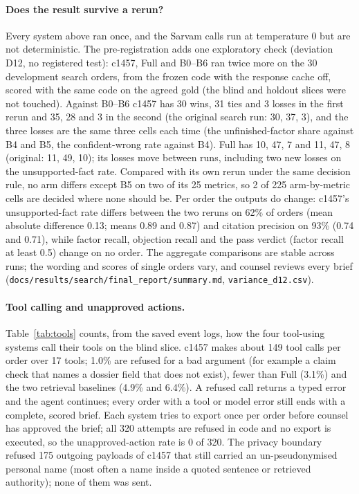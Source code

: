\paragraph{Does the result survive a rerun?} Every system above ran once, and the Sarvam calls run at temperature 0 but are not deterministic. The pre-registration adds one exploratory check (deviation D12, no registered test): c1457, Full and B0--B6 ran twice more on the 30 development search orders, from the frozen code with the response cache off, scored with the same code on the agreed gold (the blind and holdout slices were not touched). Against B0--B6 c1457 has 30 wins, 31 ties and 3 losses in the first rerun and 35, 28 and 3 in the second (the original search run: 30, 37, 3), and the three losses are the same three cells each time (the unfinished-factor share against B4 and B5, the confident-wrong rate against B4). Full has 10, 47, 7 and 11, 47, 8 (original: 11, 49, 10); its losses move between runs, including two new losses on the unsupported-fact rate. Compared with its own rerun under the same decision rule, no arm differs except B5 on two of its 25 metrics, so 2 of 225 arm-by-metric cells are decided where none should be. Per order the outputs do change: c1457's unsupported-fact rate differs between the two reruns on 62\% of orders (mean absolute difference 0.13; means 0.89 and 0.87) and citation precision on 93\% (0.74 and 0.71), while factor recall, objection recall and the pass verdict (factor recall at least 0.5) change on no order. The aggregate comparisons are stable across runs; the wording and scores of single orders vary, and counsel reviews every brief (\texttt{docs/results/search/final\_report/summary.md}, \texttt{variance\_d12.csv}).


\paragraph{Tool calling and unapproved actions.} Table~\ref{tab:tools} counts, from the saved event logs, how the four tool-using systems call their tools on the blind slice. c1457 makes about 149 tool calls per order over 17 tools; 1.0\% are refused for a bad argument (for example a claim check that names a dossier field that does not exist), fewer than Full (3.1\%) and the two retrieval baselines (4.9\% and 6.4\%). A refused call returns a typed error and the agent continues; every order with a tool or model error still ends with a complete, scored brief. Each system tries to export once per order before counsel has approved the brief; all 320 attempts are refused in code and no export is executed, so the unapproved-action rate is 0 of 320. The privacy boundary refused 175 outgoing payloads of c1457 that still carried an un-pseudonymised personal name (most often a name inside a quoted sentence or retrieved authority); none of them was sent.


